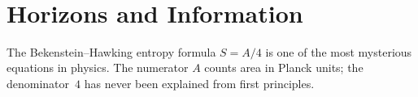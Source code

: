 \documentclass[11pt,a4paper]{book}
\begin{document}
\begin{code}
\\
%
\>[2]\AgdaSymbol{;}\AgdaSpace{}%
\AgdaSpace{}%
\AgdaSymbol{=}\AgdaSpace{}%
\AgdaSpace{}%
\AgdaSymbol{;}\AgdaSpace{}%
\AgdaSpace{}%
\AgdaSymbol{=}\AgdaSpace{}%
\<%
\\
%
\>[2]\AgdaSymbol{;}\AgdaSpace{}%
\AgdaSpace{}%
\AgdaSymbol{=}\AgdaSpace{}%
\AgdaSpace{}%
\AgdaSymbol{;}\AgdaSpace{}%
\AgdaSpace{}%
\AgdaSymbol{=}\AgdaSpace{}%
\<%
\\
%
\>[2]\AgdaSymbol{;}\AgdaSpace{}%
\AgdaSpace{}%
\AgdaSymbol{=}\AgdaSpace{}%
\AgdaSpace{}%
\AgdaSymbol{;}\AgdaSpace{}%
\AgdaSpace{}%
\AgdaSymbol{=}\AgdaSpace{}%
\<%
\\
%
\>[2]\AgdaSymbol{;}\AgdaSpace{}%
\AgdaSpace{}%
\AgdaSymbol{=}\AgdaSpace{}%
\AgdaSpace{}%
\AgdaSymbol{;}\AgdaSpace{}%
\AgdaSpace{}%
\AgdaSymbol{=}\AgdaSpace{}%
\<%
\\
%
\>[2]\AgdaSymbol{;}\AgdaSpace{}%
\AgdaSpace{}%
\AgdaSymbol{=}\AgdaSpace{}%
\AgdaSpace{}%
\AgdaSymbol{;}\AgdaSpace{}%
\AgdaSpace{}%
\AgdaSymbol{=}\AgdaSpace{}%
\<%
\\
%
\>[2]\AgdaSymbol{;}\AgdaSpace{}%
\AgdaSpace{}%
\AgdaSymbol{=}\AgdaSpace{}%
\AgdaSpace{}%
\AgdaSymbol{;}\AgdaSpace{}%
\AgdaSpace{}%
\AgdaSymbol{=}\AgdaSpace{}%
\AgdaSpace{}%
\AgdaSymbol{\}}\<%
\end{code}

\chapter{Horizons and Information}
\label{ch:horizons-information}

The Bekenstein--Hawking entropy formula $S = A / 4$ is one of the most
mysterious equations in physics.  The numerator $A$ counts area in Planck
units; the denominator~$4$ has never been explained from first principles.
\end{document}
